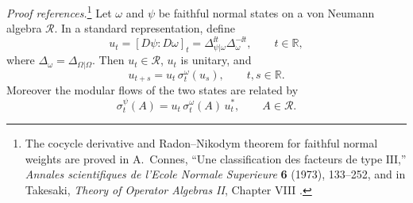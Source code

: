 \begin{quotedtheorem}
\label{thm:connes-cocycle-derivative}
\emph{Proof references.}\footnote{The cocycle derivative and Radon--Nikodym
theorem for faithful normal weights are proved in A.~Connes,
``Une classification des facteurs de type \(\mathrm{III}\),''
\emph{Annales scientifiques de l'Ecole Normale Superieure} \textbf{6}
(1973), 133--252, and in Takesaki, \emph{Theory of Operator Algebras II},
Chapter VIII \cite{Connes1973}.}
Let \(\omega\) and \(\psi\) be faithful normal states on a von Neumann algebra
\(\mathcal R\).  In a standard representation, define
\[
  u_t=[D\psi:D\omega]_t
  =
  \Delta_{\psi|\omega}^{\ii t}\Delta_\omega^{-\ii t},
  \qquad t\in\mathbb R ,
\]
where \(\Delta_\omega=\Delta_{\Omega|\Omega}\).  Then \(u_t\in\mathcal R\),
\(u_t\) is unitary, and
\begin{equation}
  u_{t+s}=u_t\,\sigma_t^\omega(u_s),
  \qquad t,s\in\mathbb R .
  \label{eq:connes-cocycle-relation}
\end{equation}
Moreover the modular flows of the two states are related by
\begin{equation}
  \sigma_t^\psi(A)
  =
  u_t\,\sigma_t^\omega(A)\,u_t^*,
  \qquad A\in\mathcal R .
  \label{eq:connes-cocycle-implements-flow}
\end{equation}
\end{quotedtheorem}

